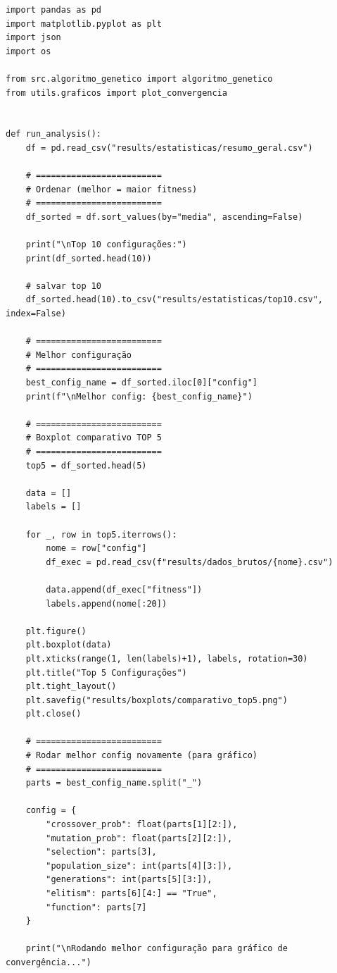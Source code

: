 \documentclass[a4paper,12pt]{article}
\begin{document}
\begin{lstlisting}[caption={experiments/analise\_final.py}]
import pandas as pd
import matplotlib.pyplot as plt
import json
import os

from src.algoritmo_genetico import algoritmo_genetico
from utils.graficos import plot_convergencia


def run_analysis():
    df = pd.read_csv("results/estatisticas/resumo_geral.csv")

    # =========================
    # Ordenar (melhor = maior fitness)
    # =========================
    df_sorted = df.sort_values(by="media", ascending=False)

    print("\nTop 10 configurações:")
    print(df_sorted.head(10))

    # salvar top 10
    df_sorted.head(10).to_csv("results/estatisticas/top10.csv", index=False)

    # =========================
    # Melhor configuração
    # =========================
    best_config_name = df_sorted.iloc[0]["config"]
    print(f"\nMelhor config: {best_config_name}")

    # =========================
    # Boxplot comparativo TOP 5
    # =========================
    top5 = df_sorted.head(5)

    data = []
    labels = []

    for _, row in top5.iterrows():
        nome = row["config"]
        df_exec = pd.read_csv(f"results/dados_brutos/{nome}.csv")

        data.append(df_exec["fitness"])
        labels.append(nome[:20])

    plt.figure()
    plt.boxplot(data)
    plt.xticks(range(1, len(labels)+1), labels, rotation=30)
    plt.title("Top 5 Configurações")
    plt.tight_layout()
    plt.savefig("results/boxplots/comparativo_top5.png")
    plt.close()

    # =========================
    # Rodar melhor config novamente (para gráfico)
    # =========================
    parts = best_config_name.split("_")

    config = {
        "crossover_prob": float(parts[1][2:]),
        "mutation_prob": float(parts[2][2:]),
        "selection": parts[3],
        "population_size": int(parts[4][3:]),
        "generations": int(parts[5][3:]),
        "elitism": parts[6][4:] == "True",
        "function": parts[7]
    }

    print("\nRodando melhor configuração para gráfico de convergência...")


\end{lstlisting}
\end{document}
